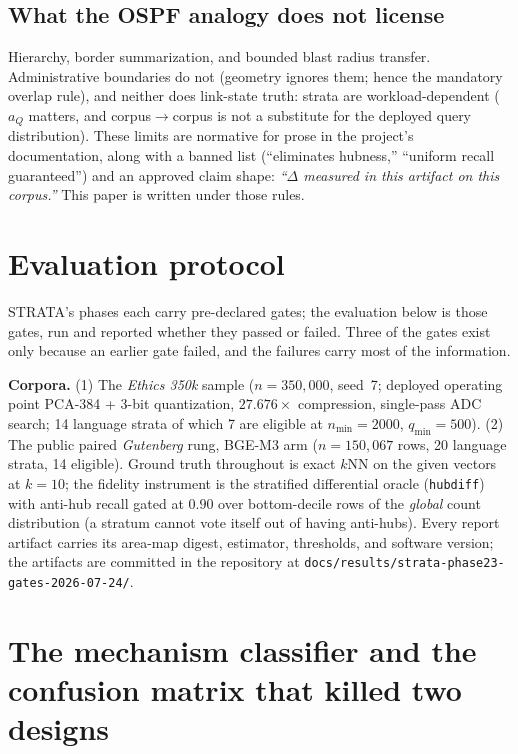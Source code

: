 \documentclass[sigconf, nonacm]{acmart}
\begin{document}
\subsection{What the OSPF analogy does not license}
\label{sec:limits}

Hierarchy, border summarization, and bounded blast radius transfer.
Administrative boundaries do not (geometry ignores them; hence the
mandatory overlap rule), and neither does link-state truth: strata are
workload-dependent ($a_Q$ matters, and corpus$\to$corpus is not a
substitute for the deployed query distribution). These limits are
normative for prose in the project's documentation, along with a banned
list (``eliminates hubness,'' ``uniform recall guaranteed'') and an
approved claim shape: \emph{``$\Delta$ measured in this artifact on this
corpus.''} This paper is written under those rules.

\section{Evaluation protocol}
\label{sec:method}

STRATA's phases each carry pre-declared gates; the evaluation below is
those gates, run and reported whether they passed or failed. Three of the
gates exist only because an earlier gate failed, and the failures carry
most of the information.

\textbf{Corpora.} (1) The \emph{Ethics 350k} sample ($n=350{,}000$,
seed~7; deployed operating point PCA-384 + 3-bit quantization,
$27.676\times$ compression, single-pass ADC search; 14 language strata of
which 7 are eligible at $n_{\min}=2000$, $q_{\min}=500$). (2) The public
paired \emph{Gutenberg} rung, BGE-M3 arm ($n=150{,}067$ rows, 20 language
strata, 14 eligible). Ground truth throughout is exact $k$NN on the given
vectors at $k=10$; the fidelity instrument is the stratified differential
oracle (\texttt{hubdiff}) with anti-hub recall gated at $0.90$ over
bottom-decile rows of the \emph{global} count distribution (a stratum
cannot vote itself out of having anti-hubs). Every report artifact carries
its area-map digest, estimator, thresholds, and software version; the
artifacts are committed in the repository at
\texttt{docs/results/strata-}\allowbreak\texttt{phase23-gates-2026-07-24/}.

\section{The mechanism classifier and the confusion matrix that killed two designs}
\label{sec:confusion}
\end{document}
